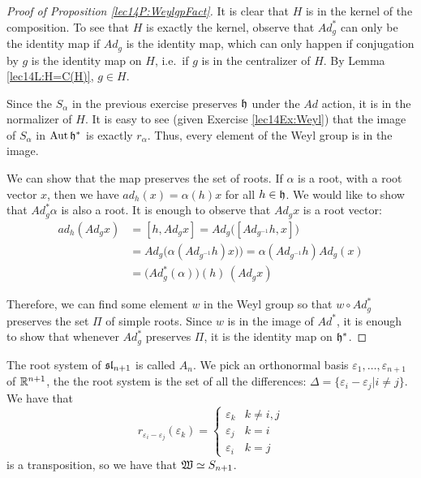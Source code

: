  \begin{proof}[Proof of Proposition \ref{lec14P:WeylgpFact}]
   It is clear that $H$ is in the kernel of the composition. To see that $H$ is
   exactly the kernel, observe that $Ad^*_g$ can only be the identity map if $Ad_g$ is
   the identity map, which can only happen if conjugation by $g$ is the identity map
   on $H$, i.e.\ if $g$ is in the centralizer of $H$. By Lemma \ref{lec14L:H=C(H)},
   $g\in H$.

   Since the $S_\alpha$ in the previous exercise preserves $\h$ under the $Ad$ action,
   it is in the normalizer of $H$. It is easy to see (given Exercise \ref{lec14Ex:Weyl})
   that the image of $S_\alpha$ in $\aut \h^*$ is exactly $r_\alpha$. Thus, every
   element of the Weyl group is in the image.

   We can show that the map preserves the set of roots. If $\alpha$ is a root, with a
   root vector $x$, then we have $ad_h(x)=\alpha(h)x$ for all $h\in \h$. We would like
   to show that $Ad^*_g \alpha$ is also a root. It is enough to observe that $Ad_{g}x$
   is a root vector:
   \begin{align*}
     ad_h(Ad_{g}x) &= [h,Ad_{g}x] = Ad_{g}\big( [Ad_{g^{-1}} h, x] \big)\\
        &= Ad_{g}\big( \alpha(Ad_{g^{-1}} h) x) \big) = \alpha(Ad_{g^{-1}}h) Ad_g(x)\\
        &= \big(Ad^*_g(\alpha)\big)(h)\, (Ad_g x)
   \end{align*}

   Therefore, we can find some element $w$ in the Weyl group so that $w\circ Ad^*_g$
   preserves the set $\Pi$ of simple roots. Since $w$ is in the image of $Ad^*$, it is
   enough to show that whenever $Ad^*_g$ preserves $\Pi$, it is the identity map on
   $\h^*$.

 \end{proof}

 \begin{example}\label{lec14Eg:A_n}
   The root system of $\sl_{n+1}$ is called $A_n$.
   We pick an orthonormal basis $\varepsilon_1,\dots,\varepsilon_{n+1}$ of
   $\RR^{n+1}$, the the root system is the set of all the differences: $\Delta = \{
   \varepsilon_i - \varepsilon_j | i\neq j\}$. We have that
   \[
    r_{\varepsilon_i - \varepsilon_j}(\varepsilon_k) = \left\{
    \begin{array}{cl}
      \varepsilon_k & k\neq i,j\\
      \varepsilon_j & k=i\\
      \varepsilon_i & k=j
    \end{array} \right.
   \]
   is a transposition, so we have that $\weyl\simeq S_{n+1}$.
 \end{example}

